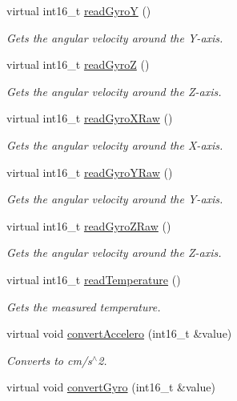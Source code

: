 \begin{DoxyCompactItemize}
virtual int16\+\_\+t \hyperlink{classMpu6050_a32291036eb3c88455bc8054d5014d99c}{read\+GyroY} ()
\begin{DoxyCompactList}\small\item\em Gets the angular velocity around the Y-\/axis. \end{DoxyCompactList}\item 
virtual int16\+\_\+t \hyperlink{classMpu6050_ad9259b8dcbdf7f8e1473fc4b0d9273e4}{read\+GyroZ} ()
\begin{DoxyCompactList}\small\item\em Gets the angular velocity around the Z-\/axis. \end{DoxyCompactList}\item 
virtual int16\+\_\+t \hyperlink{classMpu6050_a8047b6ee1c7e151664e5d8bc94dd3c11}{read\+Gyro\+X\+Raw} ()
\begin{DoxyCompactList}\small\item\em Gets the angular velocity around the X-\/axis. \end{DoxyCompactList}\item 
virtual int16\+\_\+t \hyperlink{classMpu6050_a080b7bea5ae0c8e839ee763aabb8a31c}{read\+Gyro\+Y\+Raw} ()
\begin{DoxyCompactList}\small\item\em Gets the angular velocity around the Y-\/axis. \end{DoxyCompactList}\item 
virtual int16\+\_\+t \hyperlink{classMpu6050_a8cf0adb003855acc603230f6fd2e3887}{read\+Gyro\+Z\+Raw} ()
\begin{DoxyCompactList}\small\item\em Gets the angular velocity around the Z-\/axis. \end{DoxyCompactList}\item 
virtual int16\+\_\+t \hyperlink{classMpu6050_ad34c38e7656bfab491ebc1a9f8b21a6b}{read\+Temperature} ()
\begin{DoxyCompactList}\small\item\em Gets the measured temperature. \end{DoxyCompactList}\item 
virtual void \hyperlink{classMpu6050_ac7d9ff1fd682cf54eac232532eabd5ba}{convert\+Accelero} (int16\+\_\+t \&value)
\begin{DoxyCompactList}\small\item\em Converts to cm/s$^\wedge$2. \end{DoxyCompactList}\item 
virtual void \hyperlink{classMpu6050_ab664732bd9c7d6ce8034eac6d93987fa}{convert\+Gyro} (int16\+\_\+t \&value)

\end{DoxyCompactItemize}
